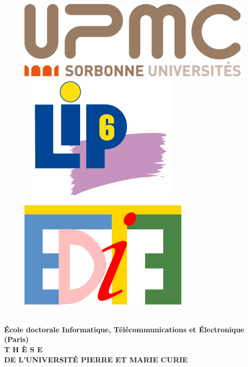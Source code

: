 
\begin{titlepage}
\thispagestyle{empty}
\begin{center}
\begin{figure}[h]
 \centering
 \includegraphics[scale=0.1]{figures/UPMC_Logo}
  \hfill{~}
 \includegraphics[scale=1]{figures/LIP6_Logo}
  \hfill{~}
 \includegraphics[scale=0.5]{figures/EDITE_Logo}
\end{figure}
\vspace*{0.4cm}
 \\
\noindent \textbf{\'Ecole doctorale Informatique, T\'el\'ecommunications et \'Electronique (Paris)} \\
\vspace*{0.5cm}
\noindent \Huge \textbf{T H \`E S E} \\
\vspace*{0.75cm}
\noindent \large \textbf{DE L'UNIVERSIT\'E PIERRE ET MARIE CURIE} \\

\end{center}
\end{titlepage}
